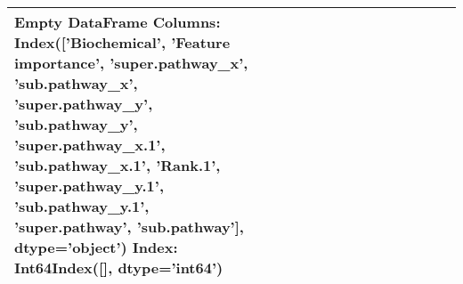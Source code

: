 \begin{tabular}{llllllllllllll}
\toprule
Empty DataFrame
Columns: Index(['Biochemical', 'Feature importance', 'super.pathway\_x', 'sub.pathway\_x',
       'super.pathway\_y', 'sub.pathway\_y', 'super.pathway\_x.1',
       'sub.pathway\_x.1', 'Rank.1', 'super.pathway\_y.1', 'sub.pathway\_y.1',
       'super.pathway', 'sub.pathway'],
      dtype='object')
Index: Int64Index([], dtype='int64') \\
\bottomrule
\end{tabular}

